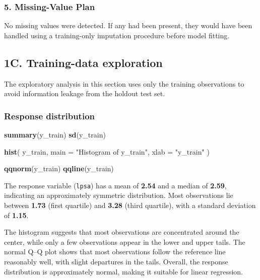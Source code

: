 \documentclass[
  11pt,
]{article}
\newenvironment{Shaded}{\begin{snugshade}}{\end{snugshade}}
\newcommand{\AttributeTok}[1]{\textcolor[rgb]{0.13,0.29,0.53}{#1}}
\newcommand{\FunctionTok}[1]{\textcolor[rgb]{0.13,0.29,0.53}{\textbf{#1}}}
\newcommand{\NormalTok}[1]{#1}
\newcommand{\StringTok}[1]{\textcolor[rgb]{0.31,0.60,0.02}{#1}}
\begin{document}
\subsubsection{5. Missing-Value Plan}\label{missing-value-plan}

No missing values were detected. If any had been present, they would
have been handled using a training-only imputation procedure before
model fitting.

\subsection{1C. Training-data
exploration}\label{c.-training-data-exploration}

The exploratory analysis in this section uses only the training
observations to avoid information leakage from the holdout test set.

\subsubsection{Response distribution}\label{response-distribution}

\begin{Shaded}
\begin{Highlighting}[]
\FunctionTok{summary}\NormalTok{(y\_train)}
\FunctionTok{sd}\NormalTok{(y\_train)}

\FunctionTok{hist}\NormalTok{(}
\NormalTok{  y\_train,}
  \AttributeTok{main =} \StringTok{"Histogram of y\_train"}\NormalTok{,}
  \AttributeTok{xlab =} \StringTok{"y\_train"}
\NormalTok{)}

\FunctionTok{qqnorm}\NormalTok{(y\_train)}
\FunctionTok{qqline}\NormalTok{(y\_train)}
\end{Highlighting}
\end{Shaded}

The response variable (\texttt{lpsa}) has a mean of \textbf{2.54} and a
median of \textbf{2.59}, indicating an approximately symmetric
distribution. Most observations lie between \textbf{1.73} (first
quartile) and \textbf{3.28} (third quartile), with a standard deviation
of \textbf{1.15}.

The histogram suggests that most observations are concentrated around
the center, while only a few observations appear in the lower and upper
tails. The normal Q--Q plot shows that most observations follow the
reference line reasonably well, with slight departures in the tails.
Overall, the response distribution is approximately normal, making it
suitable for linear regression.
\end{document}
